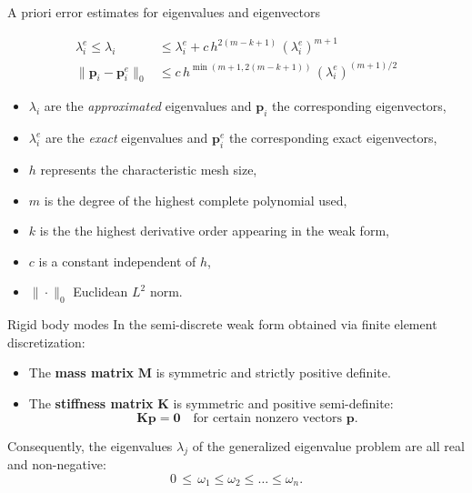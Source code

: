 \documentclass[aspectratio=169]{beamer}
\begin{document}
{\begin{frame}{A priori error estimates for eigenvalues and eigenvectors}
  \begin{tcolorbox}[colback=darkred!10,colframe=darkred!40!black]
    \vspace{-0.5cm}
    \begin{align*}
      \lambda_i^e \leq \lambda_i                    & \leq \lambda_i^e + c\, h^{2(m-k+1)}\, ({\lambda_i^e})^{m+1}  \\
      \| \boldsymbol{p}_i - \boldsymbol{p}_i^e \|_0 & \leq c\, h^{\min(m+1, 2(m-k+1))}\, ({\lambda_i^e})^{(m+1)/2}
    \end{align*}
  \end{tcolorbox}
  \begin{itemize}
    \setlength\itemsep{0.5em}
    \item \( \lambda_i \) are the \emph{approximated} eigenvalues and \(\boldsymbol p_i \) the corresponding eigenvectors,
    \item  \( \lambda_i^e\) are the \emph{exact} eigenvalues and \(\boldsymbol p_i^e \) the corresponding exact eigenvectors,
    \item \( h \) represents the characteristic mesh size,
    \item \( m \) is the degree of the highest complete polynomial used,
    \item \( k \) is the the highest derivative order appearing in the weak form,
    \item \( c \) is a constant independent of \( h \),
    \item  \( \| \cdot \|_0 \) Euclidean \( L^2 \) norm.
  \end{itemize}
\end{frame}

\begin{frame}{Rigid body modes}
  In the semi-discrete weak form obtained via finite element discretization:
  \begin{itemize}
    \item The \textbf{mass matrix} \( \mathbf{M} \) is symmetric and strictly positive definite.
    \item The \textbf{stiffness matrix} \( \mathbf{K} \) is symmetric and positive semi-definite:
          \[
            \mathbf{K} \mathbf{p} = \mathbf{0} \quad \text{for certain nonzero vectors } \mathbf{p}.
          \]
  \end{itemize}
  Consequently, the eigenvalues \( \lambda_j\) of the generalized eigenvalue problem are all real and non-negative:
  \[
    0 \,\leq\, \omega_1 \leq \omega_2 \leq \dots \leq \omega_n.
  \]


\end{frame}}
\end{document}
